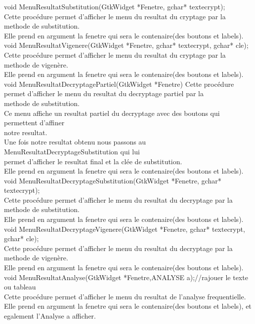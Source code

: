 \documentclass[a4]{article}
\begin{document}
	void MenuResultatSubstitution(GtkWidget *Fenetre, gchar* textecrypt);\\
		Cette procédure permet d'afficher le menu du resultat du cryptage par la methode de substitution.\\
		Elle prend en argument la fenetre qui sera le contenaire(des boutons et labels).\\
	
	void MenuResultatVigenere(GtkWidget *Fenetre, gchar* textecrypt, gchar* cle);\\
		Cette procédure permet d'afficher le menu du resultat du cryptage par la methode de vigenère.\\
		Elle prend en argument la fenetre qui sera le contenaire(des boutons et labels).\\
		
	void MenuResultatDecryptagePartiel(GtkWidget *Fenetre)
		Cette procédure permet d'afficher le menu du resultat du decryptage  partiel par la \\
		methode de substitution.\\
		Ce menu affiche un resultat partiel du decryptage avec des boutons qui permettent d'affiner\\
		notre resultat. \\
		Une fois notre resultat obtenu nous passons au MenuResultatDecryptageSubstitution qui lui \\
		permet d'afficher le resultat final et la clée de substitution.\\
		Elle prend en argument la fenetre qui sera le contenaire(des boutons et labels).\\
		
	void MenuResultatDecryptageSubstitution(GtkWidget *Fenetre, gchar* textecrypt);\\
		Cette procédure permet d'afficher le menu du resultat du decryptage par la methode de substitution.\\
		Elle prend en argument la fenetre qui sera le contenaire(des boutons et labels).\\
	
	void MenuResultatDecryptageVigenere(GtkWidget *Fenetre, gchar* textecrypt, gchar* cle);\\
		Cette procédure permet d'afficher le menu du resultat du decryptage par la methode de vigenère.\\
		Elle prend en argument la fenetre qui sera le contenaire(des boutons et labels).\\
	
	void MenuResultatAnalyse(GtkWidget *Fenetre,ANALYSE a);//rajouer le texte ou tableau\\
		Cette procédure permet d'afficher le menu du resultat de l'analyse frequentielle.\\
		Elle prend en argument la fenetre qui sera le contenaire(des boutons et labels), et egalement
		l'Analyse a afficher.\\
	
\end{document}
